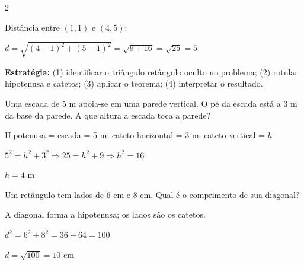 \documentclass[12pt]{article}
\begin{document}
\begin{multicols}{2}
\vspace{4pt}

Distância entre $(1, 1)$ e $(4, 5)$:

$d = \sqrt{(4-1)^2 + (5-1)^2} = \sqrt{9 + 16} = \sqrt{25} = 5$


\textbf{Estratégia:} (1) identificar o triângulo retângulo oculto no problema; (2) rotular hipotenusa e catetos; (3) aplicar o teorema; (4) interpretar o resultado.


Uma escada de 5 m apoia-se em uma parede vertical. O pé da escada está a 3 m da base da parede. A que altura a escada toca a parede?

Hipotenusa = escada = 5 m; cateto horizontal = 3 m; cateto vertical = $h$

$5^2 = h^2 + 3^2 \Rightarrow 25 = h^2 + 9 \Rightarrow h^2 = 16$

$h = 4$ m


Um retângulo tem lados de 6 cm e 8 cm. Qual é o comprimento de sua diagonal?

A diagonal forma a hipotenusa; os lados são os catetos.

$d^2 = 6^2 + 8^2 = 36 + 64 = 100$

$d = \sqrt{100} = 10$ cm

\end{multicols}


\end{document}
